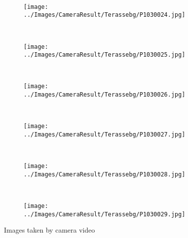 \begin{figure}[h]
\begin{subfigure}{0.19\textwidth}
\caption{}
\label{Ter10}
\end{subfigure}
~
\begin{subfigure}{0.19\textwidth}
\texttt{[image: ../Images/CameraResult/Terassebg/P1030024.jpg]}
\caption{}
\label{fig:Ter11}
\end{subfigure}
~
\begin{subfigure}{0.19\textwidth}
\texttt{[image: ../Images/CameraResult/Terassebg/P1030025.jpg]}
\caption{}
\label{fig:Ter12}
\end{subfigure}
~
\begin{subfigure}{0.19\textwidth}
\texttt{[image: ../Images/CameraResult/Terassebg/P1030026.jpg]}
\caption{}
\label{fig:Ter13}
\end{subfigure}
~
\begin{subfigure}{0.19\textwidth}
\texttt{[image: ../Images/CameraResult/Terassebg/P1030027.jpg]}
\caption{}
\label{fig:Ter14}
\end{subfigure}
~
\begin{subfigure}{0.19\textwidth}
\texttt{[image: ../Images/CameraResult/Terassebg/P1030028.jpg]}
\caption{}
\label{fig:Ter15}
\end{subfigure}
~
\begin{subfigure}{0.19\textwidth}
\texttt{[image: ../Images/CameraResult/Terassebg/P1030029.jpg]}
\caption{}
\label{fig:Ter16}
\end{subfigure}
\caption{Images taken by camera video}
\label{fig:AllTer}
\end{figure}
